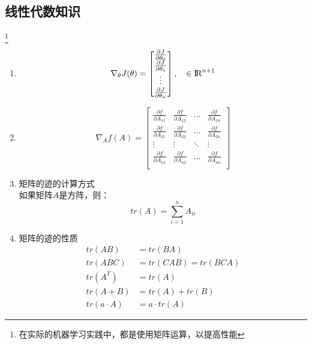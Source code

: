 \subsection{线性代数知识}\footnote{在实际的机器学习实践中，都是使用矩阵运算，以提高性能}
\begin{enumerate}
	\item
	\begin{equation}
		\nabla_{\theta}J(\theta) = \left[\begin{matrix}
		\frac{\partial J}{\partial\theta_0} \\
		\frac{\partial J}{\partial\theta_1} \\
		\vdots \\
		\frac{\partial J}{\partial\theta_n} \\
		\end{matrix}\right], \quad \in {\rm I\!R}^{n+1}
	\end{equation}

	\item
	\begin{equation}
		\nabla_Af(A) = \left[ \begin{matrix}
			\frac{\partial f}{\partial A_{11}} & \frac{\partial f}{\partial A_{12}} & \dots & \frac{\partial f}{\partial A_{1n}} \\
			\frac{\partial f}{\partial A_{21}} & \frac{\partial f}{\partial A_{22}} & \dots & \frac{\partial f}{\partial A_{2n}} \\
			\vdots & \vdots & \ddots & \vdots \\
			\frac{\partial f}{\partial A_{n1}} & \frac{\partial f}{\partial A_{n2}}& \dots & \frac{\partial f}{\partial A_{nn}} \\
		\end{matrix}\right]
	\end{equation}

	\item 矩阵的迹的计算方式 \\
	如果矩阵$A$是方阵，则：
	\begin{equation}
		tr(A) = \sum_{i=1}^nA_{ii}
	\end{equation}

	\item 矩阵的迹的性质
	\begin{align}
		tr(AB) &= tr(BA) \\
		tr(ABC) &= tr(CAB) = tr(BCA) \\
		tr(A^T) &= tr(A) \\
		tr(A+B) &= tr(A) + tr(B) \\
		tr(a\cdot A) &= a\cdot tr(A)
	\end{align}


\end{enumerate}
